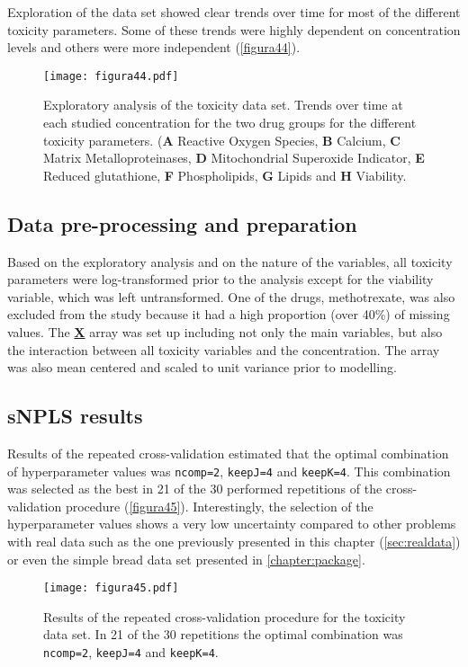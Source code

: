 Exploration of the data set showed clear trends over time for most of the different toxicity parameters. Some of these trends were highly dependent on concentration levels and others were more independent (\autoref{figura44}).

\begin{figure}[hbtp]
	\centering
\texttt{[image: figura44.pdf]}
\caption[Exploratory analysis of the toxicity data set]{Exploratory analysis of the toxicity data set. Trends over time at each studied concentration for the two drug groups for the different toxicity parameters. (\textbf{A} Reactive Oxygen Species, \textbf{B} Calcium, \textbf{C} Matrix Metalloproteinases, \textbf{D} Mitochondrial Superoxide Indicator, \textbf{E} Reduced glutathione, \textbf{F} Phospholipids, \textbf{G} Lipids and \textbf{H} Viability.}
\label{figura44}
\end{figure}

\subsection{Data pre-processing and preparation}
Based on the exploratory analysis and on the nature of the variables, all toxicity parameters were log-transformed prior to the analysis except for the viability variable, which was left untransformed. One of the drugs, methotrexate, was also excluded from the study because it had a high proportion (over 40\%) of missing values. The \underline{\textbf{X}} array was set up including not only the main variables, but also the interaction between all toxicity variables and the concentration. The array was also mean centered and scaled to unit variance prior to modelling.

\subsection{sNPLS results}
Results of the repeated cross-validation estimated that the optimal combination of hyperparameter values was \texttt{ncomp=2}, \texttt{keepJ=4} and \texttt{keepK=4}. This combination was selected as the best in 21 of the 30 performed repetitions of the cross-validation procedure (\autoref{figura45}). Interestingly, the selection of the hyperparameter values shows a very low uncertainty compared to other problems with real data such as the one previously presented in this chapter (\autoref{sec:realdata}) or even the simple bread data set presented in \autoref{chapter:package}.

\begin{figure}[hbtp]
	\centering
\texttt{[image: figura45.pdf]}
\caption[Results of the repeated cross-validation procedure for the toxicity data set]{Results of the repeated cross-validation procedure for the toxicity data set. In 21 of the 30 repetitions the optimal combination was \texttt{ncomp=2}, \texttt{keepJ=4} and \texttt{keepK=4}.}
\label{figura45}
\end{figure}

